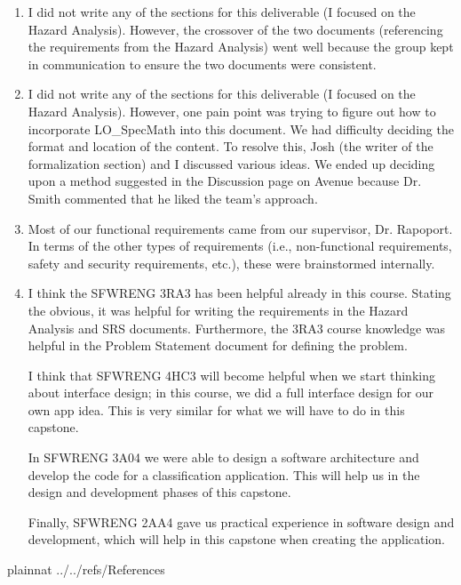 \documentclass[12pt]{article}
\begin{document}
\begin{enumerate}
  \item I did not write any of the sections for this deliverable (I focused on the Hazard Analysis). However, the crossover of the two documents (referencing the requirements from the Hazard Analysis) went well because the group kept in communication to ensure the two documents were consistent.
  \item I did not write any of the sections for this deliverable (I focused on the Hazard Analysis). However, one pain point was trying to figure out how to incorporate LO\_SpecMath into this document. We had difficulty deciding the format and location of the content. To resolve this, Josh (the writer of the formalization section) and I discussed various ideas. We ended up deciding upon a method suggested in the Discussion page on Avenue because Dr. Smith commented that he liked the team's approach.
  \item Most of our functional requirements came from our supervisor, Dr. Rapoport. In terms of the other types of requirements (i.e., non-functional requirements, safety and security requirements, etc.), these were brainstormed internally.
  \item I think the SFWRENG 3RA3 has been helpful already in this course. Stating the obvious, it was helpful for writing the requirements in the Hazard Analysis and SRS documents. Furthermore, the 3RA3 course knowledge was helpful in the Problem Statement document for defining the problem.

  I think that SFWRENG 4HC3 will become helpful when we start thinking about interface design; in this course, we did a full interface design for our own app idea. This is very similar for what we will have to do in this capstone.

  In SFWRENG 3A04 we were able to design a software architecture and develop the code for a classification application. This will help us in the design and development phases of this capstone.

  Finally, SFWRENG 2AA4 gave us practical experience in software design and development, which will help in this capstone when creating the application.
\end{enumerate}

\newpage

 {plainnat}
 {../../refs/References}

\newpage
\end{document}
